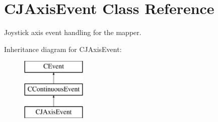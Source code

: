 \hypertarget{classCJAxisEvent}{\section{C\-J\-Axis\-Event Class Reference}
\label{classCJAxisEvent}
}


Joystick axis event handling for the mapper.  


Inheritance diagram for C\-J\-Axis\-Event\-:\begin{figure}[H]
\begin{center}
\leavevmode
\includegraphics[height=3.000000cm]{classCJAxisEvent}
\end{center}
\end{figure}
